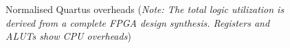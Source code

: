 		\begin{figure}[t]
		\centering 
			\caption[Normalised Quartus overheads]{Normalised Quartus overheads (\textit{Note: The total logic utilization is derived from a complete FPGA design synthesis. Registers and ALUTs show CPU overheads})} 
			\label{quartus_graph}
		\end{figure}	
		

\begin{comment}
		\begin{table}[!h]	
		\centering
		\resizebox{\textwidth}{!}{\begin{tabular}{|l||c|c||c|}
			\hline
			\multicolumn{4}{|c|}{Quartus II 64-Bit -- Version 13.1.0} \\
			\multicolumn{4}{|c|}{Family Stratix IV} \\
			\multicolumn{4}{|c|}{Device -- EP4SGX230KF40C2} \\
			\hline
			Statistic & Directory & Time-Based & FPGA Capacity \\
			\hline 
			\hline
			Total Logic Utilization & 105,720 (58\%) & 104,404 (57.2\%) &  182,400 \\
			Combinational ALUTs & 71,723 (39.3\%) & 70,312 (38.5\%) & 182,400 \\
			Total Registers & 65,456 & 64,637 & 14,625,792 \\
			Dedicated Registers & 65,059 & 64,076 & 14,625,792 \\
			Total BRAM Bits & 3,833,174 & 3,796,310 & 14,625,792 \\
			ALUT/Register Pairs & 101,134 & 99,205 & --- \\
			Clustering Difficulty & Low & Low & NA \\
			\hline
		\end{tabular}}
		\caption{Dual-core BERI FPGA Resource Overhead Comparison (Mean)}
		\label{fpga_other_overheads}
		\end{table}
\end{comment}

